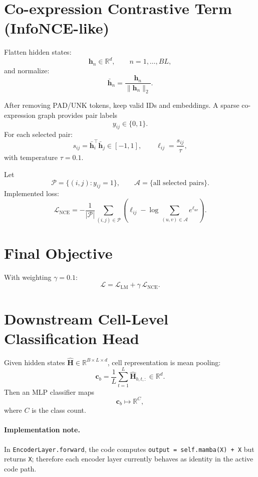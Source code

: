 \documentclass[11pt]{article}
\begin{document}
\section{Co-expression Contrastive Term (InfoNCE-like)}
Flatten hidden states:
\begin{equation}
\bm{h}_n\in\mathbb{R}^{d},\qquad n=1,\ldots,BL,
\end{equation}
and normalize:
\begin{equation}
\bar{\bm{h}}_n = \frac{\bm{h}_n}{\lVert\bm{h}_n\rVert_2}.
\end{equation}

After removing PAD/UNK tokens, keep valid IDs and embeddings. A sparse co-expression graph provides pair labels
\begin{equation}
y_{ij}\in\{0,1\}.
\end{equation}
For each selected pair:
\begin{equation}
s_{ij}=\bar{\bm{h}}_i^{\top}\bar{\bm{h}}_j\in[-1,1],
\qquad
\ell_{ij}=\frac{s_{ij}}{\tau},
\end{equation}
with temperature $\tau=0.1$.

Let
\begin{equation}
\mathcal{P}=\{(i,j):y_{ij}=1\},
\qquad
\mathcal{A}=\{\text{all selected pairs}\}.
\end{equation}
Implemented loss:
\begin{equation}
\mathcal{L}_{\mathrm{NCE}} = -\frac{1}{|\mathcal{P}|}
\sum_{(i,j)\in\mathcal{P}}
\left(
\ell_{ij} - \log\sum_{(u,v)\in\mathcal{A}} e^{\ell_{uv}}
\right).
\end{equation}

\section{Final Objective}
With weighting $\gamma=0.1$:
\begin{equation}
\mathcal{L} = \mathcal{L}_{\mathrm{LM}} + \gamma\,\mathcal{L}_{\mathrm{NCE}}.
\end{equation}

\section{Downstream Cell-Level Classification Head}
Given hidden states $\hat{\bm{H}}\in\mathbb{R}^{B\times L\times d}$, cell representation is mean pooling:
\begin{equation}
\bm{c}_b = \frac{1}{L}\sum_{t=1}^{L}\hat{\bm{H}}_{b,t,:}\in\mathbb{R}^{d}.
\end{equation}
Then an MLP classifier maps
\begin{equation}
\bm{c}_b \mapsto \mathbb{R}^{C},
\end{equation}
where $C$ is the class count.

\paragraph{Implementation note.}
In \texttt{EncoderLayer.forward}, the code computes
\texttt{output = self.mamba(X) + X} but returns \texttt{X}; therefore each encoder layer currently behaves as identity in the active code path.
\end{document}
